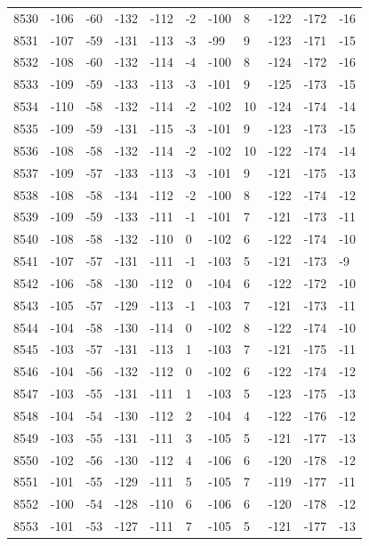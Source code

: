 \begin{table}[H]
\begin{tabular}{lllllllllll}
8530 & -106 & -60 & -132 & -112 & -2 & -100 & 8 & -122 & -172 & -16 \\
8531 & -107 & -59 & -131 & -113 & -3 & -99 & 9 & -123 & -171 & -15 \\
8532 & -108 & -60 & -132 & -114 & -4 & -100 & 8 & -124 & -172 & -16 \\
8533 & -109 & -59 & -133 & -113 & -3 & -101 & 9 & -125 & -173 & -15 \\
8534 & -110 & -58 & -132 & -114 & -2 & -102 & 10 & -124 & -174 & -14 \\
8535 & -109 & -59 & -131 & -115 & -3 & -101 & 9 & -123 & -173 & -15 \\
8536 & -108 & -58 & -132 & -114 & -2 & -102 & 10 & -122 & -174 & -14 \\
8537 & -109 & -57 & -133 & -113 & -3 & -101 & 9 & -121 & -175 & -13 \\
8538 & -108 & -58 & -134 & -112 & -2 & -100 & 8 & -122 & -174 & -12 \\
8539 & -109 & -59 & -133 & -111 & -1 & -101 & 7 & -121 & -173 & -11 \\
8540 & -108 & -58 & -132 & -110 & 0 & -102 & 6 & -122 & -174 & -10 \\
8541 & -107 & -57 & -131 & -111 & -1 & -103 & 5 & -121 & -173 & -9 \\
8542 & -106 & -58 & -130 & -112 & 0 & -104 & 6 & -122 & -172 & -10 \\
8543 & -105 & -57 & -129 & -113 & -1 & -103 & 7 & -121 & -173 & -11 \\
8544 & -104 & -58 & -130 & -114 & 0 & -102 & 8 & -122 & -174 & -10 \\
8545 & -103 & -57 & -131 & -113 & 1 & -103 & 7 & -121 & -175 & -11 \\
8546 & -104 & -56 & -132 & -112 & 0 & -102 & 6 & -122 & -174 & -12 \\
8547 & -103 & -55 & -131 & -111 & 1 & -103 & 5 & -123 & -175 & -13 \\
8548 & -104 & -54 & -130 & -112 & 2 & -104 & 4 & -122 & -176 & -12 \\
8549 & -103 & -55 & -131 & -111 & 3 & -105 & 5 & -121 & -177 & -13 \\
8550 & -102 & -56 & -130 & -112 & 4 & -106 & 6 & -120 & -178 & -12 \\
8551 & -101 & -55 & -129 & -111 & 5 & -105 & 7 & -119 & -177 & -11 \\
8552 & -100 & -54 & -128 & -110 & 6 & -106 & 6 & -120 & -178 & -12 \\
8553 & -101 & -53 & -127 & -111 & 7 & -105 & 5 & -121 & -177 & -13 \\

\end{tabular}
\end{table}
